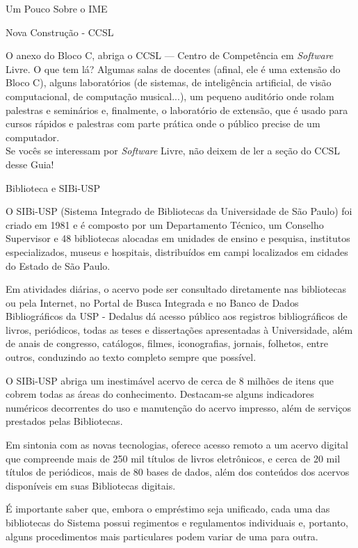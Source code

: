 \begin{secao}{Um Pouco Sobre o IME}
\begin{subsecao}{Nova Construção - CCSL}

O anexo do Bloco C, abriga o CCSL --- Centro de Competência em \textit{Software} 
Livre. O que tem lá? Algumas salas de docentes (afinal, ele é uma extensão do 
Bloco C), alguns laboratórios (de sistemas, de inteligência artificial, 
de visão computacional, de computação musical...), um pequeno auditório 
onde rolam palestras e seminários e, finalmente, o laboratório de extensão, 
que é usado para cursos rápidos e palestras com parte prática onde o público 
precise de um computador.\\
Se vocês se interessam por \textit{Software} Livre, não deixem de ler a seção 
do CCSL desse Guia!

\end{subsecao}

\begin{subsecao}{Biblioteca e SIBi-USP}

O SIBi-USP (Sistema Integrado de Bibliotecas da Universidade de São Paulo) foi
criado em 1981 e é composto por um Departamento Técnico, um Conselho Supervisor
e 48 bibliotecas alocadas em unidades de ensino e pesquisa, institutos
especializados, museus e hospitais, distribuídos em campi localizados em
cidades do Estado de São Paulo.

Em atividades diárias, o acervo pode ser consultado diretamente nas bibliotecas
ou pela Internet, no Portal de Busca Integrada e no Banco de Dados
Bibliográficos da USP - Dedalus dá acesso público aos registros bibliográficos
de livros, periódicos, todas as teses e dissertações apresentadas à
Universidade, além de anais de congresso, catálogos, filmes, iconografias,
jornais, folhetos, entre outros, conduzindo ao texto completo sempre que
possível.

O SIBi-USP abriga um inestimável acervo de cerca de 8 milhões de itens que
cobrem todas as áreas do conhecimento. Destacam-se alguns indicadores numéricos
decorrentes do uso e manutenção do acervo impresso, além de serviços prestados
pelas Bibliotecas.

Em sintonia com as novas tecnologias, oferece acesso remoto a um acervo digital
que compreende mais de 250 mil títulos de livros eletrônicos, e cerca de 20 mil
títulos de periódicos, mais de 80 bases de dados, além dos conteúdos dos acervos
disponíveis em suas Bibliotecas digitais.

É importante saber que, embora o empréstimo seja unificado, cada uma das
bibliotecas do Sistema possui regimentos e regulamentos individuais e, portanto,
alguns procedimentos mais particulares podem variar de uma para outra.


\end{subsecao}
\end{secao}
